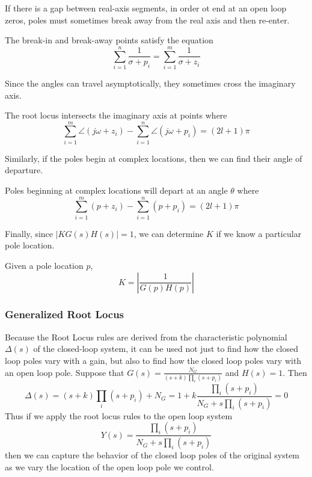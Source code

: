 If there is a gap between real-axis segments, in order ot end at an open loop zeros, poles must sometimes break away from the real axis and then re-enter.
\begin{theorem}
  The break-in and break-away points satisfy the equation
  \[
	\sum_{i=1}^n \frac{1}{\sigma + p_i} = \sum_{i=1}^m \frac{1}{\sigma+z_i}
  \]
  \label{thm:rl-six}
\end{theorem}
Since the angles can travel asymptotically, they sometimes cross the imaginary axis.
\begin{theorem}
  The root locus intersects the imaginary axis at points where \[
	\sum_{i=1}^m \angle (j\omega + z_i) - \sum_{i=1}^n \angle (j\omega + p_i) = (2l+1)\pi 
  \]
  \label{thm:rl-seven}
\end{theorem}
Similarly, if the poles begin at complex locations, then we can find their angle of departure.
\begin{theorem}
  Poles beginning at complex locations will depart at an angle $\theta$ where \[
	\sum_{i=1}^m (p + z_i) - \sum_{i=1}^n (p + p_i) = (2l+1)\pi
  \]

  \label{thm:rl-eight}
\end{theorem}
Finally, since $|KG(s)H(s)|=1$, we can determine $K$ if we know a particular pole location.
\begin{theorem}
  Given a pole location $p$,
  \[
	K = \left|\frac{1}{G(p)H(p)}\right|
  \]
  \label{thm:rl-nine}
\end{theorem}
\subsubsection{Generalized Root Locus}
Because the Root Locus rules are derived from the characteristic polynomial $\Delta(s)$ of the closed-loop system, it can be used not just to find how the closed loop poles vary with a gain, but also to find how the closed loop poles vary with an open loop pole.
Suppose that $G(s) = \frac{N_G}{(s+k)\prod_i(s+p_i)}$ and $H(s) = 1$. Then
\[
  \Delta(s) = (s+k)\prod_i(s+p_i) + N_G = 1 + k\frac{\prod_i (s+p_i) }{N_G + s\prod_i(s+p_i)} = 0
\]
Thus if we apply the root locus rules to the open loop system
\[
  Y(s) = \frac{\prod_i (s+p_i) }{N_G + s\prod_i(s+p_i)}
\]
then we can capture the behavior of the closed loop poles of the original system as we vary the location of the open loop pole we control.
